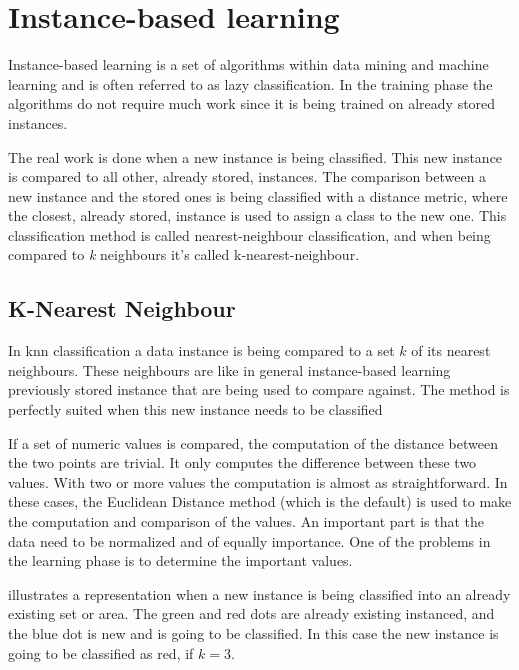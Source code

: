 \section{Instance-based learning}\label{sec:theoryInstanceLearning}
Instance-based learning is a set of algorithms within data mining and machine learning and is often referred to as lazy classification.
In the training phase the algorithms do not require much work since it is being trained on already stored instances.
\cite[p. 78]{DataMiningPractical2011} 

\bigskip

The real work is done when a new instance is being classified.
This new instance is compared to all other, already stored, instances. 
The comparison between a new instance and the stored ones is being classified with a distance metric, where the closest, already stored, instance is used to assign a class to the new one.
This classification method is called nearest-neighbour classification, and when being compared to \textit{k} neighbours it's called k-nearest-neighbour.
\cite[p. 78]{DataMiningPractical2011} 

\bigskip



\subsection{K-Nearest Neighbour}\label{sec:theoryUnClassKnn}
In \acrfull{knn} classification a data instance is being compared to a set $k$ of its nearest neighbours.
These neighbours are like in general instance-based learning previously stored instance that are being used to compare against.
The method is perfectly suited when this new instance needs to be classified \cite[p. 77-79]{DataMiningPractical2011}

\bigskip

If a set of  numeric values is compared, the computation of the distance between the two points are trivial. 
It only computes the difference between these two values.
With two or more values the computation is almost as straightforward.
In these cases, the Euclidean Distance method (which is the default) is used to make the computation and comparison of the values.
An important part is that the data need to be normalized and of equally importance.
One of the problems in the learning phase is to determine the important values.
\cite[p. 77-79]{DataMiningPractical2011}

\bigskip

 illustrates a representation when a new instance is being classified into an already existing set or area.
The green and red dots are already existing instanced, and the blue dot is new and is going to be classified.
In this case the new instance is going to be classified as red, if $k=3$.

